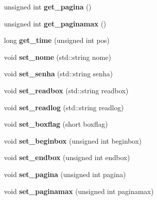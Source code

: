 \begin{DoxyCompactItemize}
unsigned int {\bfseries get\+\_\+pagina} ()
\item 
\mbox{\label{class_sessao_a15d26986cbf049c2ea1ad8656b2d40c7}} 
unsigned int {\bfseries get\+\_\+paginamax} ()
\item 
\mbox{\label{class_sessao_a2cba302a8d94c4bf2568e5341cfeda33}} 
long {\bfseries get\+\_\+time} (unsigned int pos)
\item 
\mbox{\label{class_sessao_aac5b7dca8b4f3591bb9ba21a4cb8e2d6}} 
void {\bfseries set\+\_\+nome} (std\+::string nome)
\item 
\mbox{\label{class_sessao_a91182799fe147eb9bfdf555a75f1ee6e}} 
void {\bfseries set\+\_\+senha} (std\+::string senha)
\item 
\mbox{\label{class_sessao_a34d853354f2c6331036f4d94d86172ff}} 
void {\bfseries set\+\_\+readbox} (std\+::string readbox)
\item 
\mbox{\label{class_sessao_af7057024a8c54b662b209e53a3c7c428}} 
void {\bfseries set\+\_\+readlog} (std\+::string readlog)
\item 
\mbox{\label{class_sessao_aed966f81dbb34f9c93c0181856913fd2}} 
void {\bfseries set\+\_\+boxflag} (short boxflag)
\item 
\mbox{\label{class_sessao_a07b88af7ef83b882f54539b5c67c9e0d}} 
void {\bfseries set\+\_\+beginbox} (unsigned int beginbox)
\item 
\mbox{\label{class_sessao_ad08a96c6ad1ac1ef98a5728b7a152a5b}} 
void {\bfseries set\+\_\+endbox} (unsigned int endbox)
\item 
\mbox{\label{class_sessao_a2c33bc0a8fbabae8135c4fba2c9bda0f}} 
void {\bfseries set\+\_\+pagina} (unsigned int pagina)
\item 
\mbox{\label{class_sessao_a5f3ba427d188af24c6560299c5bacde0}} 
void {\bfseries set\+\_\+paginamax} (unsigned int paginamax)
\item 
\mbox{\label{class_sessao_ae6ed99bc843201fa863868e3fdd80f24}} 

\end{DoxyCompactItemize}
